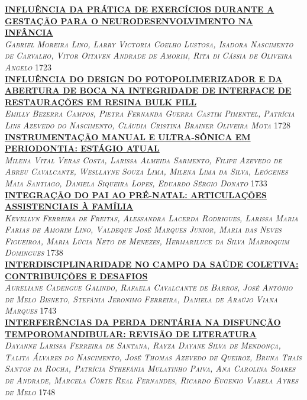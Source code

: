 \noindent \textsc{\hyperlink{trabalhos/251790.pdf.1}{\textbf{INFLUÊNCIA DA PRÁTICA DE EXERCÍCIOS DURANTE A GESTAÇÃO PARA O NEURODESENVOLVIMENTO NA INFÂNCIA}}}\\ 
\noindent \textsc{\textit{Gabriel Moreira Lino, Larry Victoria Coelho Lustosa, Isadora Nascimento de Carvalho, Vitor Oitaven Andrade de Amorim, Rita di Cássia de Oliveira Angelo}} \hfill 1723\\ 

\noindent \textsc{\hyperlink{trabalhos/251431.pdf.1}{\textbf{INFLUÊNCIA DO DESIGN DO FOTOPOLIMERIZADOR E DA ABERTURA DE BOCA NA INTEGRIDADE DE INTERFACE DE RESTAURAÇÕES EM RESINA BULK FILL}}}\\ 
\noindent \textsc{\textit{Emilly Bezerra Campos, Pietra Fernanda Guerra Castim Pimentel, Patrícia Lins Azevedo do Nascimento, Cláudia Cristina Brainer Oliveira Mota}} \hfill 1728\\ 

\noindent \textsc{\hyperlink{trabalhos/250245.pdf.1}{\textbf{INSTRUMENTAÇÃO MANUAL E ULTRA-SÔNICA EM PERIODONTIA: ESTÁGIO ATUAL}}}\\ 
\noindent \textsc{\textit{Milena Vital Veras Costa, Larissa Almeida Sarmento, Filipe Azevedo de Abreu Cavalcante, Wesllayne Souza Lima, Milena Lima da Silva, Leógenes Maia Santiago, Daniela Siqueira Lopes, Eduardo Sérgio Donato}} \hfill 1733\\ 

\noindent \textsc{\hyperlink{trabalhos/250205.pdf.1}{\textbf{INTEGRAÇÃO DO PAI AO PRÉ-NATAL: ARTICULAÇÕES ASSISTENCIAIS À FAMÍLIA}}}\\ 
\noindent \textsc{\textit{Kevellyn Ferreira de Freitas, Alessandra Lacerda Rodrigues, Larissa Maria Farias de Amorim Lino, Valdeque José Marques Junior, Maria das Neves Figueiroa, Maria Lúcia Neto de Menezes, Hermariluce da Silva Marroquim Domingues}} \hfill 1738\\ 

\noindent \textsc{\hyperlink{trabalhos/250274.pdf.1}{\textbf{INTERDISCIPLINARIDADE NO CAMPO DA SAÚDE COLETIVA: CONTRIBUIÇÕES E DESAFIOS}}}\\ 
\noindent \textsc{\textit{Aureliane Cadengue Galindo, Rafaela Cavalcante de Barros, José Antônio de Melo Bisneto, Stefânia Jeronimo Ferreira, Daniela de Araújo Viana Marques}} \hfill 1743\\ 

\noindent \textsc{\hyperlink{trabalhos/249008.pdf.1}{\textbf{INTERFERÊNCIAS DA PERDA DENTÁRIA NA DISFUNÇÃO TEMPOROMANDIBULAR: REVISÃO DE LITERATURA}}}\\ 
\noindent \textsc{\textit{Dayanne Larissa Ferreira de Santana, Rayza Dayane Silva de Mendonça, Talita Álvares do Nascimento, José Thomas Azevedo de Queiroz, Bruna Thaís Santos da Rocha, Patrícia Sthefânia Mulatinho Paiva, Ana Carolina Soares de Andrade, Marcela Côrte Real Fernandes, Ricardo Eugenio Varela Ayres de Melo}} \hfill 1748\\ 

